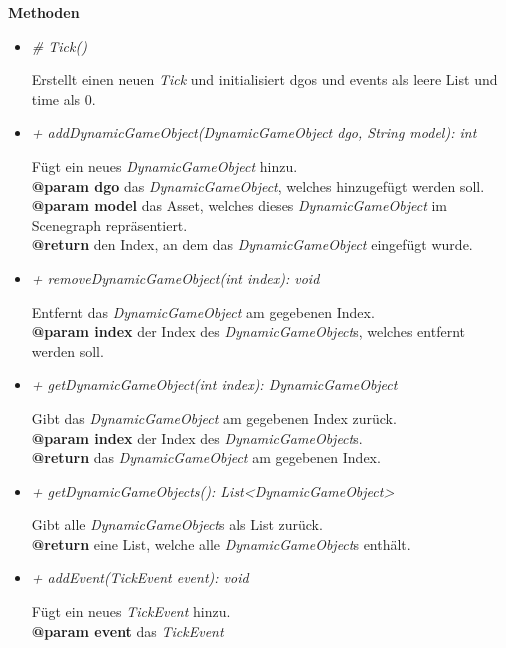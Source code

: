         \textbf{Methoden}
        \begin{itemize}
            \item \textit{\# Tick()}
                \begin{leftbar}[0.9\linewidth]
                    Erstellt einen neuen \textit{Tick} und initialisiert dgos und events als leere List und time als 0.
                \end{leftbar}
            \item \textit{+ addDynamicGameObject(DynamicGameObject dgo, String model): int}
                \begin{leftbar}[0.9\linewidth]
                    Fügt ein neues \textit{DynamicGameObject} hinzu.\\
                    \textbf{@param dgo} das \textit{DynamicGameObject}, welches hinzugefügt werden soll.\\
                    \textbf{@param model} das Asset, welches dieses \textit{DynamicGameObject} im Scenegraph repräsentiert.\\
                    \textbf{@return} den Index, an dem das \textit{DynamicGameObject} eingefügt wurde.
                \end{leftbar}
            \item \textit{+ removeDynamicGameObject(int index): void}
                \begin{leftbar}[0.9\linewidth]
                    Entfernt das \textit{DynamicGameObject} am gegebenen Index.\\
                    \textbf{@param index} der Index des \textit{DynamicGameObject}s, welches entfernt werden soll.
                \end{leftbar}
            \item \textit{+ getDynamicGameObject(int index): DynamicGameObject}
                \begin{leftbar}[0.9\linewidth]
                    Gibt das \textit{DynamicGameObject} am gegebenen Index zurück.\\
                    \textbf{@param index} der Index des \textit{DynamicGameObject}s.\\
                    \textbf{@return } das \textit{DynamicGameObject} am gegebenen Index.
                \end{leftbar}
            \item \textit{+ getDynamicGameObjects(): List<DynamicGameObject>}
                \begin{leftbar}[0.9\linewidth]
                    Gibt alle \textit{DynamicGameObject}s als List zurück.\\
                    \textbf{@return } eine List, welche alle \textit{DynamicGameObject}s enthält.
                \end{leftbar}
            \item \textit{+ addEvent(TickEvent event): void}
                \begin{leftbar}[0.9\linewidth]
                    Fügt ein neues \textit{TickEvent} hinzu.\\
                    \textbf{@param event} das \textit{TickEvent}
                \end{leftbar}
            

\end{itemize}

